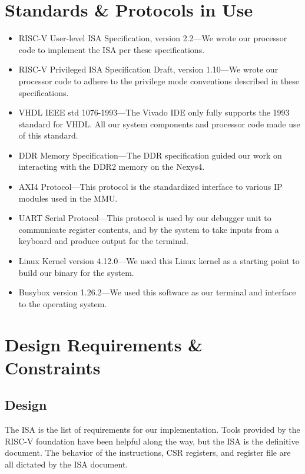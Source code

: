 \documentclass{article}
\begin{document}
\pagebreak 
\section{Standards \& Protocols in Use}

\begin{itemize}
    \item RISC-V User-level ISA Specification, version 2.2---We wrote our processor code to implement the ISA per these specifications.

    \item RISC-V Privileged ISA Specification Draft, version 1.10---We wrote our processor code to adhere to the privilege mode conventions described in these specifications.

    \item VHDL IEEE std 1076-1993---The Vivado IDE only fully supports the 1993 standard for VHDL.  All	our system components and processor code made use of this standard.

    \item DDR Memory Specification---The DDR specification guided our work on interacting with the DDR2 memory on the Nexys4.
	
    \item AXI4 Protocol---This protocol is the standardized interface to various IP modules used in the MMU.
	
    \item UART Serial Protocol---This protocol is used by our debugger unit to communicate register contents, and by the system to take inputs from a keyboard and produce output for the terminal.
	
    \item Linux Kernel version 4.12.0---We used this Linux kernel as a starting point to build our binary for the system.
	
    \item Busybox version 1.26.2---We used this software as our terminal and interface to the operating system.

\end{itemize}

\section{Design Requirements \& Constraints}

\subsection{Design}
  The ISA is the list of requirements for our implementation.  Tools provided by the RISC-V foundation
  have been helpful along the way, but the ISA is the definitive document.  The behavior of the instructions,
  CSR registers, and register file are all dictated by the ISA document.
\end{document}
